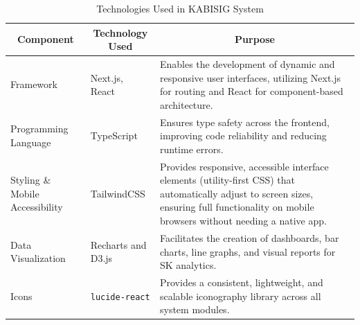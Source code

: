\begin{table}[H]
\centering
\caption{Technologies Used in KABISIG System}
\label{tab:technologies_used}
\begin{tabular}{|l|p{3.5cm}|p{6.5cm}|}
\hline
\multicolumn{1}{|c|}{\textbf{Component}} & \multicolumn{1}{c|}{\textbf{Technology Used}} & \multicolumn{1}{c|}{\textbf{Purpose}} \\ \hline
Framework & Next.js, React & Enables the development of dynamic and responsive user interfaces, utilizing Next.js for routing and React for component-based architecture. \\ \hline
Programming Language & TypeScript & Ensures type safety across the frontend, improving code reliability and reducing runtime errors. \\ \hline
Styling \& Mobile Accessibility & TailwindCSS & Provides responsive, accessible interface elements (utility-first CSS) that automatically adjust to screen sizes, ensuring full functionality on mobile browsers without needing a native app. \\ \hline
Data Visualization & Recharts and D3.js & Facilitates the creation of dashboards, bar charts, line graphs, and visual reports for SK analytics. \\ \hline
Icons & \texttt{lucide-react} & Provides a consistent, lightweight, and scalable iconography library across all system modules. \\ \hline
\end{tabular}
\end{table}
\vspace{5mm}


